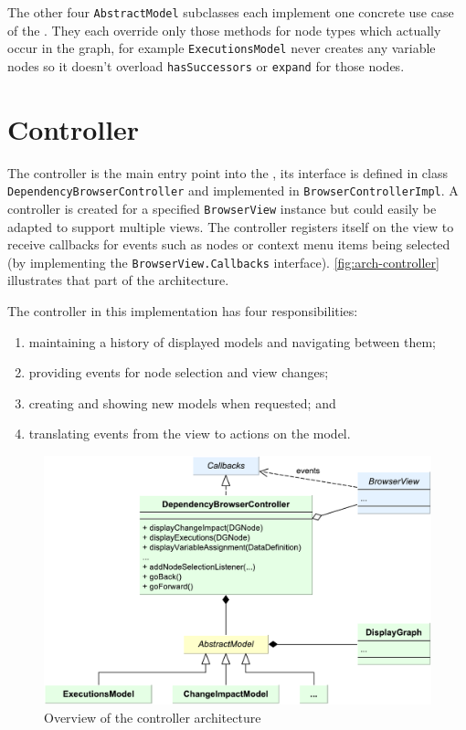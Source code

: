 
The other four \lstinline|AbstractModel| subclasses each implement one concrete use case of the \SB. They each override 
only those methods for node types which actually occur in the graph, for example \lstinline|ExecutionsModel| never 
creates any variable nodes so it doesn't overload \lstinline|hasSuccessors| or \lstinline|expand| for those nodes.


\section{Controller}

The controller is the main entry point into the \SB, its interface is defined in class 
\lstinline|DependencyBrowserController| and implemented in \lstinline|BrowserControllerImpl|. A controller is created 
for a specified \lstinline|BrowserView| instance but could easily be adapted to support multiple views. The controller 
registers itself on the view to receive callbacks for events such as nodes or context menu items being selected (by 
implementing the \lstinline|BrowserView.Callbacks| interface). \autoref{fig:arch-controller} illustrates that part of 
the architecture.

The controller in this implementation has four responsibilities:
\begin{enumerate}
  \item maintaining a history of displayed models and navigating between them;
  \item providing events for node selection and view changes;
  \item creating and showing new models when requested; and
  \item translating events from the view to actions on the model.
\end{enumerate}

\begin{figure}[htb]
  \centering
    \includegraphics[scale=0.6]{bilder/arch-controller}
  \caption{Overview of the controller architecture}
  \label{fig:arch-controller}
\end{figure}

